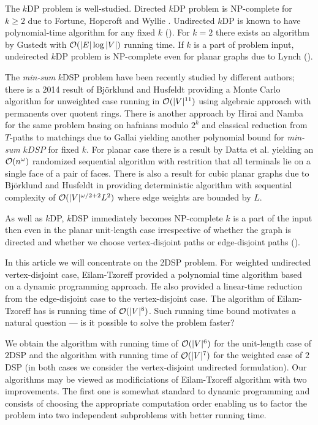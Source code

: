 The $k$DP problem is well-studied. Directed $k$DP problem is NP-complete for $k \geq 2$ due to Fortune, Hopcroft and Wyllie \cite{FHW}. Undirected $k$DP is known to have polynomial-time algorithm for any fixed $k$ (\cite{RS}). For $k = 2$ there exists an algorithm by Gustedt \cite{Gustedt} with $\mathcal{O}(|E| \log |V|)$ running time. If $k$ is a part of problem input, undeirected $k$DP problem is NP-complete even for planar graphs due to Lynch (\cite{Lynch}).

The \textit{min-sum} $k$DSP problem have been recently studied by different authors; there is a 2014 result of Björklund and Husfeldt \cite{BHICALP} providing a Monte Carlo algorithm for unweighted case running in $\mathcal{O}(|V|^{11})$ using algebraic approach with permanents over quotent rings. There is another approach by Hirai and Namba \cite{HN} for the same problem basing on hafnians modulo $2^k$ and classical reduction from $T$-paths to matchings due to Gallai \cite{Gallai} yielding another polynomial bound for \textit{min-sum} $kDSP$ for fixed $k$. For planar case there is a result by Datta et al. \cite{Datta} yielding an $\mathcal{O}(n^\omega)$ randomized sequential algorithm with restrition that all terminals lie on a single face of a pair of faces. There is also a result for cubic planar graphs due to Björklund and Husfeldt in \cite{BHPlanar} providing deterministic algorithm with sequential complexity of $\mathcal{O}(|V|^{\omega / 2 + 2} L^2)$ where edge weights are bounded by $L$. 

As well as $k$DP, $k$DSP immediately becomes NP-complete $k$ is a part of the input then even in the planar unit-length case irrespective of whether the graph is directed and whether we choose vertex-disjoint paths or edge-disjoint paths (\cite{ET}).

In this article we will concentrate on the 2DSP problem. For weighted undirected vertex-disjoint case, Eilam-Tzoreff provided a polynomial time algorithm based on a dynamic programming approach. He also provided a linear-time reduction from the edge-disjoint case to the vertex-disjoint case. The algorithm of Eilam-Tzoreff has is running time of $\mathcal{O}(|V|^8)$. Such running time bound motivates a natural question --- is it possible to solve the problem faster?

We obtain the algorithm with running time of $\mathcal{O}(|V|^6)$ for the unit-length case of $2$DSP and the algorithm with running time of $\mathcal{O}(|V|^7)$ for the weighted case of $2$DSP (in both cases we consider the vertex-disjoint undirected formulation). Our algorithms may be viewed as modificiations of Eilam-Tzoreff algorithm with two improvements. The first one is somewhat standard to dynamic programming and consists of choosing the appropriate computation order enabling us to factor the problem into two independent subproblems with better running time. 

